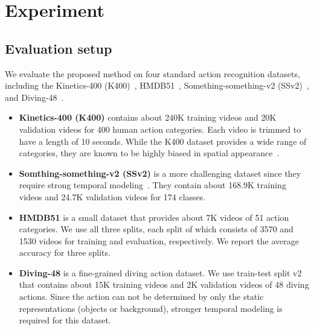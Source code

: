 \section{Experiment}
\vspace{-3pt}
\subsection{Evaluation setup} \vspace{-5pt}
    We evaluate the proposed method on four standard action recognition datasets, including the Kinetics-400 (K400)~\cite{k400}, HMDB51~\cite{hmdb51}, Something-something-v2 (SSv2)~\cite{ssv2}, and Diving-48~\cite{diving}. \vspace{-5pt}
\begin{itemize}
    \item{\textbf{Kinetics-400 (K400)} contains about 240K training videos and 20K validation videos for 400 human action categories.
    Each video is trimmed to have a length of 10 seconds.
    While the K400 dataset provides a wide range of categories, they are known to be highly biased in spatial appearance~\cite{k400-bias}.}\vspace{-5pt}
    \item{\textbf{Somthing-something-v2 (SSv2)} is a more challenging dataset since they require strong temporal modeling~\cite{k400-bias}.
    They contain about 168.9K training videos and 24.7K validation videos for 174 classes.}\vspace{-5pt}
    \item{\textbf{HMDB51} is a small dataset that provides about 7K videos of 51 action categories.
    We use all three splits, each split of which consists of 3570 and 1530 videos for training and evaluation, respectively.
    We report the average accuracy for three splits.}\vspace{-5pt}
    \item{\textbf{Diving-48} is a fine-grained diving action dataset.
    We use train-test split v2 that contains about 15K training videos and 2K validation videos of 48 diving actions.
    Since the action can not be determined by only the static representations (\eg objects or background), stronger temporal modeling is required for this dataset.}\vspace{-5pt}
\end{itemize}
    
